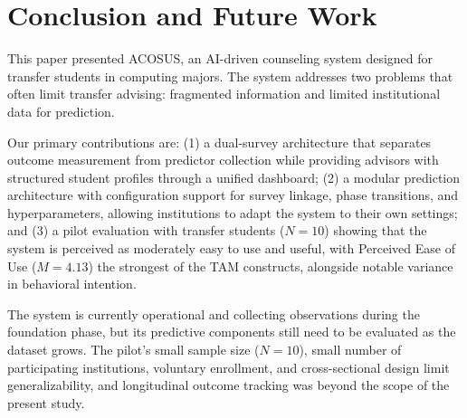 \documentclass[letterpaper,11pt]{article}
\begin{document}
%
%

\section{Conclusion and Future Work}\label{sec:conclusion}

This paper presented ACOSUS, an AI-driven counseling system designed for transfer students in computing majors. The system addresses two problems that often limit transfer advising: fragmented information and limited institutional data for prediction.

Our primary contributions are: (1) a dual-survey architecture that separates outcome measurement from predictor collection while providing advisors with structured student profiles through a unified dashboard; (2) a modular prediction architecture with configuration support for survey linkage, phase transitions, and hyperparameters, allowing institutions to adapt the system to their own settings; and (3) a pilot evaluation with transfer students ($N=10$) showing that the system is perceived as moderately easy to use and useful, with Perceived Ease of Use ($M=4.13$) the strongest of the TAM constructs, alongside notable variance in behavioral intention.

The system is currently operational and collecting observations during the foundation phase, but its predictive components still need to be evaluated as the dataset grows. %
The pilot's small sample size ($N=10$), small number of participating institutions, voluntary enrollment, and cross-sectional design limit generalizability, and longitudinal outcome tracking was beyond the scope of the present study.
\end{document}
